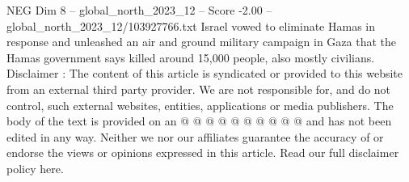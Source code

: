 \begin{textsample}{NEG Dim 8 – global\_north\_2023\_12 – Score -2.00 – global\_north\_2023\_12/103927766.txt}
Israel vowed to eliminate Hamas in response and unleashed an air and ground military campaign in Gaza that the Hamas government says killed around 15,000 people, also mostly civilians.
Disclaimer : The content of this article is syndicated or provided to this website from an external third party provider.
We are not responsible for, and do not control, such external websites, entities, applications or media publishers.
The body of the text is provided on an @ @ @ @ @ @ @ @ @ @ and has not been edited in any way.
Neither we nor our affiliates guarantee the accuracy of or endorse the views or opinions expressed in this article.
Read our full disclaimer policy here.

\end{textsample}
